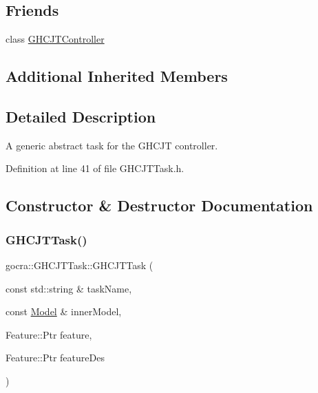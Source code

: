 \subsection*{Friends}
\begin{DoxyCompactItemize}
\item 
class \hyperlink{classgocra_1_1GHCJTTask_ad38e451271fa3f064d99a850190a56e7}{G\+H\+C\+J\+T\+Controller}
\end{DoxyCompactItemize}
\subsection*{Additional Inherited Members}


\subsection{Detailed Description}
A generic abstract task for the G\+H\+C\+JT controller. 



Definition at line 41 of file G\+H\+C\+J\+T\+Task.\+h.



\subsection{Constructor \& Destructor Documentation}
\hypertarget{classgocra_1_1GHCJTTask_a9161a72cfe5261e5a3580fba578ef23f}{}\label{classgocra_1_1GHCJTTask_a9161a72cfe5261e5a3580fba578ef23f} 
\subsubsection{\texorpdfstring{G\+H\+C\+J\+T\+Task()}{GHCJTTask()}\hspace{0.1cm}{\footnotesize\ttfamily [1/2]}}
{\footnotesize\ttfamily gocra\+::\+G\+H\+C\+J\+T\+Task\+::\+G\+H\+C\+J\+T\+Task (\begin{DoxyParamCaption}\item[{const std\+::string \&}]{task\+Name,  }\item[{const \hyperlink{classocra_1_1Model}{Model} \&}]{inner\+Model,  }\item[{Feature\+::\+Ptr}]{feature,  }\item[{Feature\+::\+Ptr}]{feature\+Des }\end{DoxyParamCaption})}

